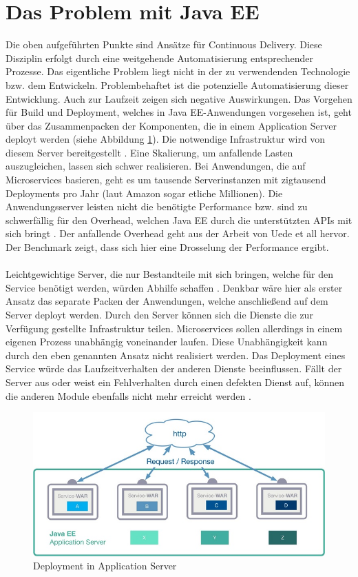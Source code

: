 \section{Das Problem mit Java EE}
Die oben aufgeführten Punkte sind Ansätze für Continuous Delivery. Diese Disziplin erfolgt durch eine weitgehende Automatisierung entsprechender Prozesse. Das eigentliche Problem liegt nicht in der zu verwendenden Technologie bzw. dem Entwickeln. Problembehaftet ist die potenzielle Automatisierung dieser Entwicklung. Auch zur Laufzeit zeigen sich negative Auswirkungen. Das Vorgehen für Build und Deployment, welches in Java EE-Anwendungen vorgesehen ist, geht über das Zusammenpacken der Komponenten, die in einem Application Server deployt werden (siehe Abbildung \ref{fig:mp1}). Die notwendige Infrastruktur wird von diesem Server bereitgestellt \cite{LarsRowekamp.2017d}. Eine Skalierung, um anfallende Lasten auszugleichen, lassen sich schwer realisieren. Bei Anwendungen, die auf Microservices basieren, geht es um tausende Serverinstanzen mit zigtausend Deployments pro Jahr (laut Amazon sogar etliche Millionen). Die Anwendungsserver leisten nicht die benötigte Performance bzw. sind zu schwerfällig für den Overhead, welchen Java EE durch die unterstützten APIs mit sich bringt \cite{jaxcenter.2016}. Der anfallende Overhead geht aus der Arbeit von Uede et all \cite{uht.2016} hervor. Der Benchmark zeigt, dass sich hier eine Drosselung der Performance ergibt. \\ \\
Leichtgewichtige Server, die nur Bestandteile mit sich bringen, welche für den Service benötigt werden, würden Abhilfe schaffen \cite{jaxcenter.2016}. Denkbar wäre hier als erster Ansatz das separate Packen der Anwendungen, welche anschließend auf dem Server deployt werden. Durch den Server können sich die Dienste die zur Verfügung gestellte Infrastruktur teilen. Microservices sollen allerdings in einem eigenen Prozess unabhängig voneinander laufen. Diese Unabhängigkeit kann durch den eben genannten Ansatz nicht realisiert werden. Das Deployment eines Service würde das Laufzeitverhalten der anderen Dienste beeinflussen. Fällt der Server aus oder weist ein Fehlverhalten durch einen defekten Dienst auf, können die anderen Module ebenfalls nicht mehr erreicht werden \cite{LarsRowekamp.2017d}.
\begin{figure}[h!]
	\centering
	\includegraphics[width=1.0\linewidth]{images/mp1}
	\caption{Deployment in Application Server \cite{LarsRowekamp.2017d}}
	\label{fig:mp1}
\end{figure}

